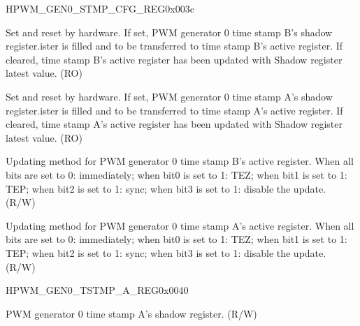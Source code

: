 \begin{register}{H}{PWM\_GEN0\_STMP\_CFG\_REG}{0x003c}\label{regdesc:PWMGEN0STMPCFGREG}
%
%
%
%
%
\regnewline%
\begin{regdesc}\begin{reglist}
\item [PWM\_GEN0\_B\_SHDW\_FULL]Set and reset by hardware. If set, PWM generator 0 time stamp B's shadow register.ister is filled and to be transferred to time stamp B's active register. If cleared, time stamp B's active register has been updated with Shadow register latest value. (RO)
\item [PWM\_GEN0\_A\_SHDW\_FULL]Set and reset by hardware. If set, PWM generator 0 time stamp A's shadow register.ister is filled and to be transferred to time stamp A's active register. If cleared, time stamp A's active register has been updated with Shadow register latest value. (RO)
\item [PWM\_GEN0\_B\_UPMETHOD]Updating method for PWM generator 0 time stamp B's active register. When all bits are set to 0: immediately; when bit0 is set to 1: TEZ; when bit1 is set to 1: TEP; when bit2 is set to 1: sync; when bit3 is set to 1: disable the update. (R/W)
\item [PWM\_GEN0\_A\_UPMETHOD]Updating method for PWM generator 0 time stamp A's active register. When all bits are set to 0: immediately; when bit0 is set to 1: TEZ; when bit1 is set to 1: TEP; when bit2 is set to 1: sync; when bit3 is set to 1: disable the update. (R/W)
\end{reglist}\end{regdesc}
\end{register}


\begin{register}{H}{PWM\_GEN0\_TSTMP\_A\_REG}{0x0040}\label{regdesc:PWMGEN0TSTMPAREG}
%
%
\regnewline%
\begin{regdesc}\begin{reglist}
\item [PWM\_GEN0\_A]PWM generator 0 time stamp A's shadow register. (R/W)
\end{reglist}\end{regdesc}
\end{register}


